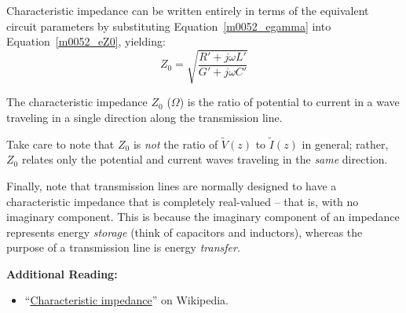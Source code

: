 Characteristic impedance can be written entirely in terms of the equivalent circuit parameters by substituting Equation~\ref{m0052_egamma} into Equation~\ref{m0052_eZ0}, yielding: 
%
\begin{equation}
\boxed{
Z_0 = \sqrt{\frac{R' + j\omega L'}{G' + j\omega C'}}
}
\end{equation}  
%
\begin{mdframed}[backgroundcolor=yellow!20,nobreak=true] 
The characteristic impedance 
$Z_0$ ($\Omega$) is the ratio of potential to current in a wave traveling in a single direction along the transmission line.
\end{mdframed}

Take care to note that $Z_0$ is \emph{not} the ratio of $\widetilde{V}(z)$ to $\widetilde{I}(z)$ in general; rather, $Z_0$ relates only the potential and current waves traveling in the \emph{same} direction.

Finally, note that transmission lines are normally designed to have a characteristic impedance that is completely real-valued -- that is, with no imaginary component.  This is because the imaginary component of an impedance represents energy \emph{storage} (think of capacitors and inductors), whereas the purpose of a transmission line is energy \emph{transfer}.


{\bf Additional Reading:}
\begin{itemize}
\item ``\href{https://en.wikipedia.org/wiki/Characteristic_impedance}{Characteristic impedance}'' on Wikipedia.
\end{itemize}


